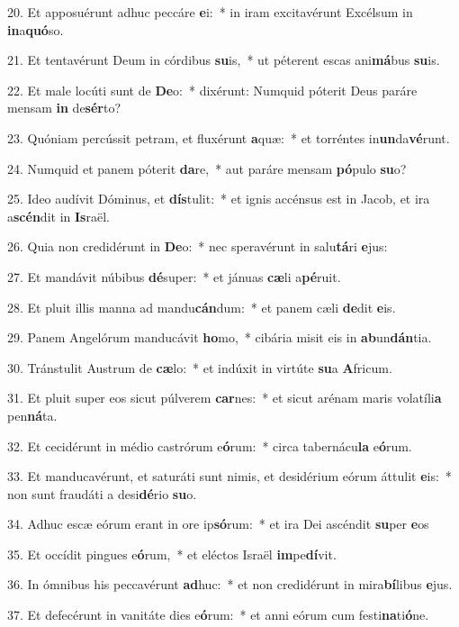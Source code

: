 20. Et apposuérunt adhuc peccáre \textbf{e}i:~*  in iram excitavérunt Excélsum in \textbf{in}a\textbf{quó}so.\

21. Et tentavérunt Deum in córdibus \textbf{su}is,~*  ut péterent escas ani\textbf{má}bus \textbf{su}is.\

22. Et male locúti sunt de \textbf{De}o:~*  dixérunt: Numquid póterit Deus paráre mensam \textbf{in} de\textbf{sér}to?\

23. Quóniam percússit petram, et fluxérunt \textbf{a}quæ:~*  et torréntes in\textbf{un}da\textbf{vé}runt.\

24. Numquid et panem póterit \textbf{da}re,~*  aut paráre mensam \textbf{pó}pulo \textbf{su}o?\

25. Ideo audívit Dóminus, et \textbf{dís}tulit:~*  et ignis accénsus est in Jacob, et ira a\textbf{scén}dit in \textbf{Is}raël.\

26. Quia non credidérunt in \textbf{De}o:~*  nec speravérunt in salu\textbf{tá}ri \textbf{e}jus:\

27. Et mandávit núbibus \textbf{dé}super:~*  et jánuas \textbf{cæ}li a\textbf{pé}ruit.\

28. Et pluit illis manna ad mandu\textbf{cán}dum:~*  et panem cæli \textbf{de}dit \textbf{e}is.\

29. Panem Angelórum manducávit \textbf{ho}mo,~*  cibária misit eis in \textbf{ab}un\textbf{dán}tia.\

30. Tránstulit Austrum de \textbf{cæ}lo:~*  et indúxit in virtúte \textbf{su}a \textbf{A}fricum.\

31. Et pluit super eos sicut púlverem \textbf{car}nes:~*  et sicut arénam maris volatíli\textbf{a} pen\textbf{ná}ta.\

32. Et cecidérunt in médio castrórum e\textbf{ó}rum:~*  circa tabernácu\textbf{la} e\textbf{ó}rum.\

33. Et manducavérunt, et saturáti sunt nimis, et desidérium eórum áttulit \textbf{e}is:~*  non sunt fraudáti a desi\textbf{dé}rio \textbf{su}o.\

34. Adhuc escæ eórum erant in ore ip\textbf{só}rum:~*  et ira Dei ascéndit \textbf{su}per \textbf{e}os\

35. Et occídit pingues e\textbf{ó}rum,~*  et eléctos Israël \textbf{im}pe\textbf{dí}vit.\

36. In ómnibus his peccavérunt \textbf{ad}huc:~*  et non credidérunt in mira\textbf{bí}libus \textbf{e}jus.\

37. Et defecérunt in vanitáte dies e\textbf{ó}rum:~*  et anni eórum cum festi\textbf{na}ti\textbf{ó}ne.\

